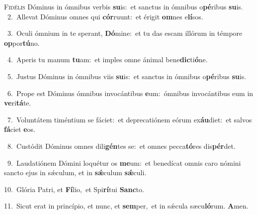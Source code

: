 \lettrine{\initial\textcolor{\initialcolor}{F}}{idélis} Dóminus in ómnibus verbis \textbf{su}\-is:~\star et sanctus in ómnibus o\-\textbf{pé}\-ribus \textbf{su}\-is.\\
{\numbfont\textcolor{\numbcolor}{~2.}}~Allevat Dóminus omnes qui \textbf{cór}\-ruunt:~\star et érigit \textbf{om}\-nes e\-\textbf{lí}\-sos.\par
{\numbfont\textcolor{\numbcolor}{~3.}}~Oculi ómnium in te sperant, \textbf{Dó}\-mine:~\star et tu das escam illórum in témpore \textbf{op}\-por\-\textbf{tú}\-no.\par
{\numbfont\textcolor{\numbcolor}{~4.}}~Aperis tu manum \textbf{tu}\-am:~\star et imples omne ánimal bene\-\textbf{dic}\-ti\-\textbf{ó}\-ne.\par
{\numbfont\textcolor{\numbcolor}{~5.}}~Justus Dóminus in ómnibus viis \textbf{su}\-is:~\star et sanctus in ómnibus o\-\textbf{pé}\-ribus \textbf{su}\-is.\par
{\numbfont\textcolor{\numbcolor}{~6.}}~Prope est Dóminus ómnibus invocántibus \textbf{e}\-um:~\star ómnibus invocántibus eum in \textbf{ve}\-ri\-\textbf{tá}\-te.\par
{\numbfont\textcolor{\numbcolor}{~7.}}~Voluntátem timéntium se fáciet:~\dagger et deprecatiónem eórum ex\-\textbf{áu}\-diet:~\star et salvos \textbf{fá}\-ciet \textbf{e}\-os.\par
{\numbfont\textcolor{\numbcolor}{~8.}}~Custódit Dóminus omnes dili\-\textbf{gén}\-tes se:~\star et omnes pecca\-\textbf{tó}\-res dis\-\textbf{pér}\-det.\par
{\numbfont\textcolor{\numbcolor}{~9.}}~Laudatiónem Dómini loquétur os \textbf{me}\-um:~\star et benedícat omnis caro nómini sancto ejus in sǽculum, et in \textbf{sǽ}\-culum \textbf{sǽ}\-culi.\par
{\numbfont\textcolor{\numbcolor}{10.}}~Glória Patri, et \textbf{Fí}\-lio,~\star et Spi\-\textbf{rí}\-tui \textbf{Sanc}\-to.\par
{\numbfont\textcolor{\numbcolor}{11.}}~Sicut erat in princípio, et nunc, et \textbf{sem}\-per,~\star et in sǽcula sæcu\-\textbf{ló}\-rum. \textbf{A}\-men.\par
